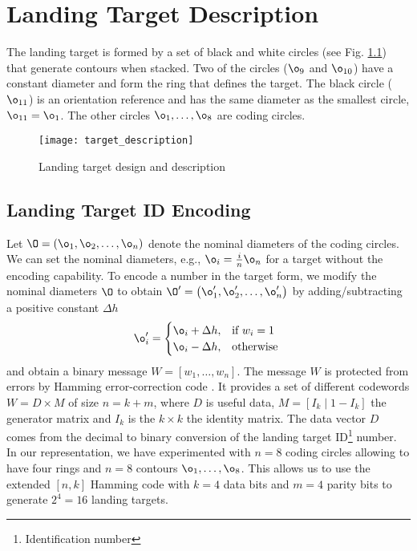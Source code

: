 
\chapter{Landing Target Description}\label{ch:target_description}
The landing target is formed by a set of black and white circles (see Fig. \ref{fig:target_description}) that generate contours when stacked. Two of the circles ($\o_{9}$ and $\o_{10}$) have a constant diameter and form the ring that defines the target. The black circle ($\o_{11}$) is an orientation reference and has the same diameter as the smallest circle, $\o_{11}=\o_{1}$. The other circles $\o_{1}, \ldots, \o_{8}$ are coding circles.

\begin{figure}[h!]
\centering
\texttt{[image: target\_description]}
\caption{Landing target design and description}
\label{fig:target_description}
\end{figure}

\section{Landing Target ID Encoding}
Let $\O=\left( \o_{1}, \o_{2},\ldots,\o_{n}\right) $ denote the nominal diameters of the coding circles. We can set the nominal diameters, e.g., $\o_{i}=\frac{i}{n}\o_{n}$ for a target without the encoding capability. To encode a number in the target form, we modify the nominal diameters $\O$ to obtain $\O'=\left( \o_{1}', \o_{2}',\ldots,\o_{n}'\right) $ by adding/subtracting a positive constant $\Delta h$
\begin{equation}
\o_{i}'=
\begin{cases}
  \o_{i}+\Delta h, & \text{if } w_{i}=1 \\
  \o_{i}- \Delta h, & \text{otherwise }
\end{cases}
\end{equation}
and obtain a binary message  $W=[w_{1}, \dots,w_{n}]$. The message $W$ is protected from errors by Hamming error-correction code \citep{Hamming:BSTJ:1950}. It provides a set of different codewords $W= D\times M$ of size $n=k+m$, where $D$ is useful data, $ M=[I_{k}\mid 1-I_{k}]$ the generator matrix and $I_{k}$ is the $k\times k$ the identity matrix. The data vector $D$ comes from the decimal to binary conversion of the landing target ID\footnote[1]{Identification number} number. In our representation, we have experimented with $n=8$ coding circles allowing to have four rings and $n=8$ contours $\o_{1}, \ldots, \o_{8}$. This allows us to use the extended $[n,k]$ Hamming code with $k=4$ data bits and $m=4$ parity bits to generate $2^{4}=16$ landing targets.

